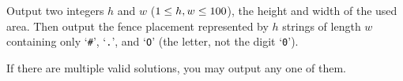 \begin{Output}
    Output two integers $h$ and $w$ ($1 \leq h, w \leq 100$), the height and width of the used area.
    Then output the fence placement represented by $h$ strings of length $w$ containing only `\texttt{\#}', `\texttt{.}', and `\texttt{O}' (the letter, not the digit `\texttt{0}').

    If there are multiple valid solutions, you may output any one of them.
\end{Output}
